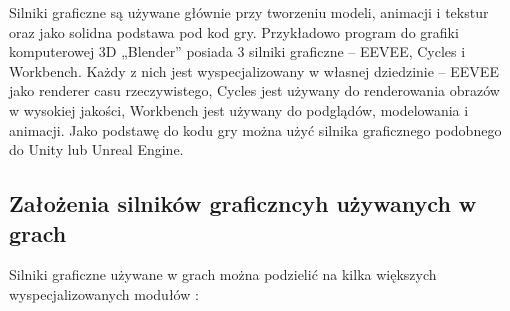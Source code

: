 \documentclass[12pt,twoside]{article}
\begin{document}
Silniki graficzne są używane głównie przy tworzeniu modeli, animacji i tekstur
oraz jako solidna podstawa pod kod gry. Przykładowo program do grafiki
komputerowej 3D „Blender” posiada 3 silniki graficzne -- EEVEE, Cycles
i Workbench. Każdy z nich jest wyspecjalizowany w własnej dziedzinie – EEVEE
jako renderer casu rzeczywistego, Cycles jest używany do renderowania obrazów w
wysokiej jakości, Workbench jest używany do podglądów, modelowania i animacji.
Jako podstawę do kodu gry można użyć silnika graficznego podobnego do Unity lub
Unreal Engine. 

\subsection{Założenia silników graficzncyh używanych w grach}

Silniki graficzne używane w grach można podzielić na kilka większych
wyspecjalizowanych modułów \cite{GameEngineArchitecture}:
\end{document}
